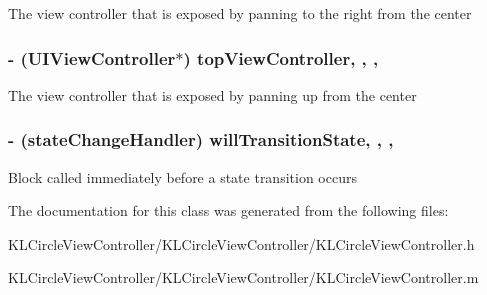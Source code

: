 The view controller that is exposed by panning to the right from the center \hypertarget{interface_k_l_circle_view_controller_adbeb75072f87e8b0f0b48f26bd146a99}{
\subsubsection[{top\-View\-Controller}]{\setlength{\rightskip}{0pt plus 5cm}-\/ (U\-I\-View\-Controller$\ast$) top\-View\-Controller\hspace{0.3cm}{\ttfamily [read]}, {\ttfamily [write]}, {\ttfamily [nonatomic]}, {\ttfamily [strong]}}}\label{interface_k_l_circle_view_controller_adbeb75072f87e8b0f0b48f26bd146a99}
The view controller that is exposed by panning up from the center \hypertarget{interface_k_l_circle_view_controller_a567f1e84ab4a5fb86fb9e526c471c1b7}{
\subsubsection[{will\-Transition\-State}]{\setlength{\rightskip}{0pt plus 5cm}-\/ (state\-Change\-Handler) will\-Transition\-State\hspace{0.3cm}{\ttfamily [read]}, {\ttfamily [write]}, {\ttfamily [nonatomic]}, {\ttfamily [copy]}}}\label{interface_k_l_circle_view_controller_a567f1e84ab4a5fb86fb9e526c471c1b7}
Block called immediately before a state transition occurs 

The documentation for this class was generated from the following files\-:\begin{DoxyCompactItemize}
\item 
K\-L\-Circle\-View\-Controller/\-K\-L\-Circle\-View\-Controller/K\-L\-Circle\-View\-Controller.\-h\item 
K\-L\-Circle\-View\-Controller/\-K\-L\-Circle\-View\-Controller/K\-L\-Circle\-View\-Controller.\-m\end{DoxyCompactItemize}
